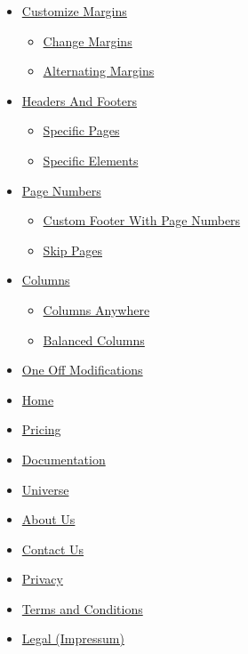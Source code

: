 \begin{itemize}
\tightlist
\item
  \hyperref[customize-margins]{Customize Margins}

  \begin{itemize}
  \tightlist
  \item
    \hyperref[change-margins]{Change Margins}
  \item
    \hyperref[alternating-margins]{Alternating Margins}
  \end{itemize}
\item
  \hyperref[headers-and-footers]{Headers And Footers}

  \begin{itemize}
  \tightlist
  \item
    \hyperref[specific-pages]{Specific Pages}
  \item
    \hyperref[specific-elements]{Specific Elements}
  \end{itemize}
\item
  \hyperref[page-numbers]{Page Numbers}

  \begin{itemize}
  \tightlist
  \item
    \hyperref[custom-footer-with-page-numbers]{Custom Footer With Page
    Numbers}
  \item
    \hyperref[skip-pages]{Skip Pages}
  \end{itemize}
\item
  \hyperref[columns]{Columns}

  \begin{itemize}
  \tightlist
  \item
    \hyperref[columns-anywhere]{Columns Anywhere}
  \item
    \hyperref[balanced-columns]{Balanced Columns}
  \end{itemize}
\item
  \hyperref[one-off-modifications]{One Off Modifications}
\end{itemize}

\begin{itemize}
\tightlist
\item
  \href{/}{Home}
\item
  \href{/pricing/}{Pricing}
\item
  \href{/docs/}{Documentation}
\item
  \href{/universe/}{Universe}
\item
  \href{/about/}{About Us}
\item
  \href{/contact/}{Contact Us}
\item
  \href{/privacy/}{Privacy}
\item
  \href{https://typst.app/terms}{Terms and Conditions}
\item
  \href{/legal/}{Legal (Impressum)}
\end{itemize}

